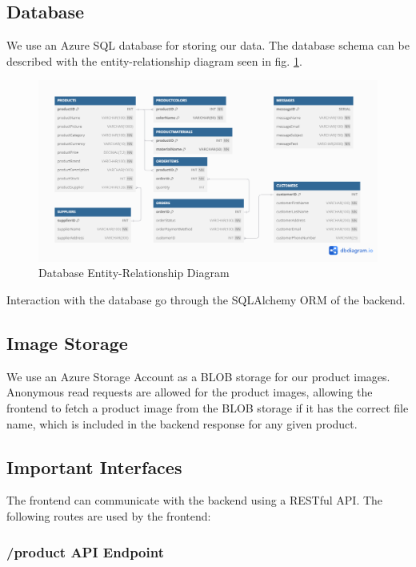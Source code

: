 \subsection{Database}
We use an Azure SQL database for storing our data.
The database schema can be described with the
entity-relationship diagram seen in fig. \ref{fig:db_er_diagram}.
\begin{figure}[!h!]
    \centering
    \includegraphics[width=\textwidth]{images/db_er_diagram.png}
    \caption{Database Entity-Relationship Diagram}
    \label{fig:db_er_diagram}
\end{figure}

Interaction with the database go through the SQLAlchemy ORM of the backend.

\subsection{Image Storage}
We use an Azure Storage Account as a BLOB storage for our product images.
Anonymous read requests are allowed for the product images,
allowing the frontend to fetch a product image from the BLOB storage
if it has the correct file name, 
which is included in the backend response for any given product.


\subsection{Important Interfaces}

The frontend can communicate with the backend using a RESTful API.
The following routes are used by the frontend:

\subsubsection{/product API Endpoint}

